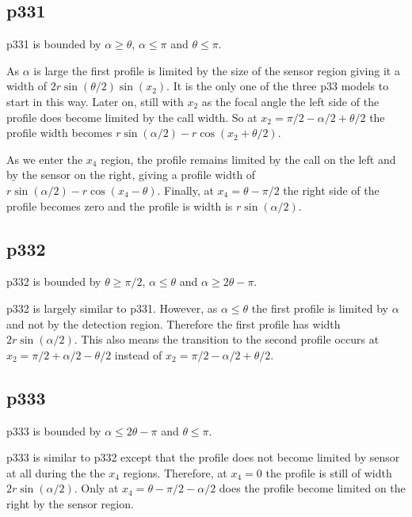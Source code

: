 \subsection{p331} \label{p331}

p331 is bounded by $\alpha \ge \theta$, $\alpha \le\pi$ and $\theta \le \pi$.

As $\alpha $ is large the first profile is limited by the size of the sensor region giving it a width of $2r\sin\left(\theta/2\right)\sin(x_2)$. It is the only one of the three p33 models to start in this way. Later on, still with $x_2$ as the focal angle the left side of the profile does become limited by the call width. So at $x_2= \pi/2 - \alpha/2 + \theta/2$ the profile width becomes $r\sin(\alpha/2) - r\cos(x_2 + \theta/2)$. 

As we enter the $x_4$ region, the profile remains limited by the call on the left and by the sensor on the right, giving a profile width of  $r\sin (\alpha /2) -r\cos(x_4-\theta) $. Finally, at $x_4 = \theta - \pi/2$ the right side of the profile becomes zero and the profile is width is $r\sin(\alpha /2)$.



\subsection{p332} \label{p332}

p332 is bounded by $\theta \ge \pi/2$, $\alpha \le \theta$ and $\alpha \ge 2\theta -\pi$.

p332 is largely similar to p331. However, as $\alpha \le \theta$ the first profile is limited by $\alpha$ and not by the detection region. Therefore the first profile has width $2r\sin(\alpha /2)$. This also means the transition to the second profile occurs at  $x_2 = \pi/2 + \alpha/2 - \theta/2$ instead of  $x_2 = \pi/2 - \alpha/2 + \theta/2$.





\subsection{p333} \label{p333}

p333 is bounded by $\alpha \le 2\theta -\pi$ and $\theta \le \pi$.

p333 is similar to p332 except that the profile does not become limited by sensor at all during the the $x_4$ regions. Therefore, at $x_4 = 0 $ the profile is still of width $2r\sin(\alpha /2)$. Only at $x_4 = \theta - \pi/2 - \alpha/2$ does the profile become limited on the right by the sensor region.

